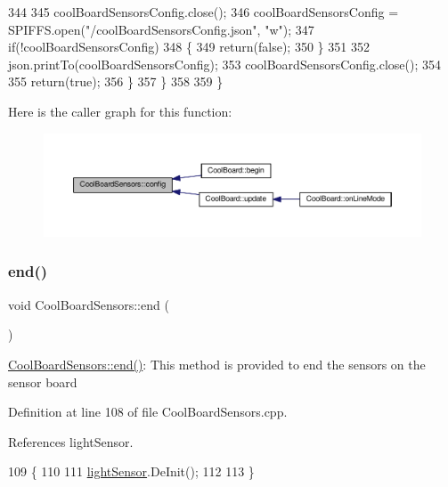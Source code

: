 \begin{DoxyCode}
344 
345             coolBoardSensorsConfig.close();         
346             coolBoardSensorsConfig = SPIFFS.open(\textcolor{stringliteral}{"/coolBoardSensorsConfig.json"}, \textcolor{stringliteral}{"w"});          
347             \textcolor{keywordflow}{if}(!coolBoardSensorsConfig)
348             \{
349                 \textcolor{keywordflow}{return}(\textcolor{keyword}{false});          
350             \}  
351 
352             json.printTo(coolBoardSensorsConfig);
353             coolBoardSensorsConfig.close();         
354             
355               \textcolor{keywordflow}{return}(\textcolor{keyword}{true}); 
356         \}
357     \}   
358 
359 \}
\end{DoxyCode}
Here is the caller graph for this function\+:
\nopagebreak
\begin{figure}[H]
\begin{center}
\leavevmode
\includegraphics[width=350pt]{classCoolBoardSensors_a9a218895c5423375c33c08f2c56fb23a_icgraph}
\end{center}
\end{figure}
\mbox{\label{classCoolBoardSensors_a4902b69f6e628bd6557193758fdd2bae}} 
\subsubsection{\texorpdfstring{end()}{end()}}
{\footnotesize\ttfamily void Cool\+Board\+Sensors\+::end (\begin{DoxyParamCaption}{ }\end{DoxyParamCaption})}

\hyperlink{classCoolBoardSensors_a4902b69f6e628bd6557193758fdd2bae}{Cool\+Board\+Sensors\+::end()}\+: This method is provided to end the sensors on the sensor board 

Definition at line 108 of file Cool\+Board\+Sensors.\+cpp.



References light\+Sensor.


\begin{DoxyCode}
109 \{
110 
111     \hyperlink{classCoolBoardSensors_a3e397300fb707dd193e909a757bf6102}{lightSensor}.DeInit();
112 
113 \}
\end{DoxyCode}
\mbox{\label{classCoolBoardSensors_ab82c2a1633768ccd12a589320fa31a14}} 
